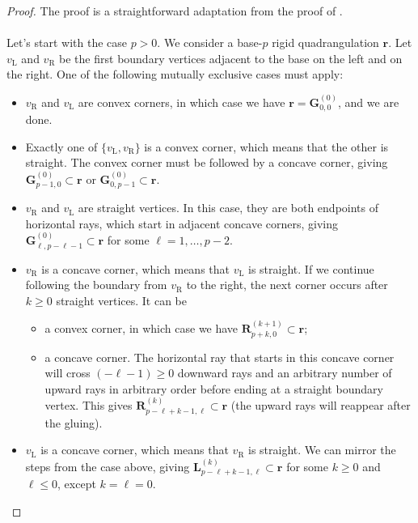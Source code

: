 \documentclass[11pt]{article}
\theoremstyle{plain}
\theoremstyle{definition}
\begin{document}
\begin{proof}
    The proof is a straightforward adaptation from the proof of \cite[Lemma~11]{Budd_rectilinear_2025}.
\\\\
    Let's start with the case $p>0$. 
    We consider a base-$p$ rigid quadrangulation $\mathbf{r}$. 
    Let $v_{\mathrm{L}}$ and $v_{\mathrm{R}}$ be the first boundary vertices adjacent to the base on the left and on the right.
    One of the following mutually exclusive cases must apply:
    \begin{itemize}[nosep]
        \item $v_{\mathrm{R}}$ and $v_{\mathrm{L}}$ are convex corners, in which case we have $\mathbf{r} = \mathbf{G}^{(0)}_{0,0}$, and we are done.
        \item Exactly one of $\{v_{\mathrm{L}},v_{\mathrm{R}}\}$ is a convex corner, which means that the other is straight. 
        The convex corner must be followed by a concave corner, giving $\mathbf{G}^{(0)}_{p-1,0} \subset \mathbf{r}$ or $\mathbf{G}^{(0)}_{0,p-1} \subset \mathbf{r}$.
        \item $v_{\mathrm{R}}$ and $v_{\mathrm{L}}$ are straight vertices. 
        In this case, they are both endpoints of horizontal rays, which start in adjacent concave corners, giving $\mathbf{G}^{(0)}_{\ell,p-\ell-1}\subset \mathbf{r}$ for some $\ell=1,\ldots,p-2$.
        \item $v_{\mathrm{R}}$ is a concave corner, which means that $v_{\mathrm{L}}$ is straight.
        If we continue following the boundary from $v_{\mathrm{R}}$ to the right, the next corner occurs after $k\geq0$ straight vertices. 
        It can be
        \begin{itemize}
            \item a convex corner, in which case we have $\mathbf{R}^{(k+1)}_{p+k,0} \subset \mathbf{r}$;
            \item a concave corner. 
            The horizontal ray that starts in this concave corner will cross $(-\ell-1)\geq0$ downward rays and an arbitrary number of upward rays in arbitrary order before ending at a straight boundary vertex.
            This gives $\mathbf{R}^{(k)}_{p-\ell+k-1,\ell} \subset \mathbf{r}$ (the upward rays will reappear after the gluing).
        \end{itemize}
        \item $v_{\mathrm{L}}$ is a concave corner, which means that $v_{\mathrm{R}}$ is straight.
        We can mirror the steps from the case above, giving $\mathbf{L}^{(k)}_{p-\ell+k-1,\ell} \subset \mathbf{r}$ for some $k\geq0$ and $\ell\leq0$, except $k=\ell=0$. 
    \end{itemize}


\end{proof}
\end{document}
